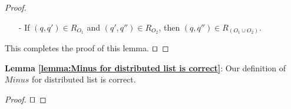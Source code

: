 \begin {proof}
\begin{itemize}
\begin{itemize}
        \begin{itemize}
        \setlength{\itemsep}{0.5pt}
        \item[-] If $\alpha' = addDel(o,r')$,then $\alpha = addDel(o',r')$, where $map_{(q,q',O)}(o')=o$.

        \item[-] Else, if $\alpha'=(m,a,b,r,arb)$, then $\exists arb$, such that $\alpha=(m,a,b,r,arb) \wedge arb' = map_{(q,q',O)}(arb - O)$.
        \end{itemize}
    \end{itemize}

\item[-] If $(q,q') \in R_{ O_1 }$ and $(q',q'') \in R_{ O_2 }$, then $(q,q'') \in R_{ ( O_1 \cup O_2 ) }$.
\end{itemize}

This completes the proof of this lemma. $\qed$
\end {proof}




{\noindent \bf Lemma \ref{lemma:Minus for distributed list is correct}}: Our definition of $Minus$ for distributed list is correct.
\begin {proof}
$\qed$
\end {proof}









